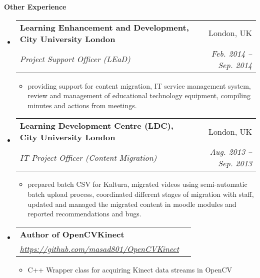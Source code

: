 \documentclass[letterpaper,11pt]{article}
\makeatletter
\newcommand{\resitem}[1]{\item #1 \vspace{-2pt}}
\newcommand{\resheading}[1]{{\large \colorbox{mygrey}{\begin{minipage}{\textwidth}{\textbf{#1 \vphantom{p\^{E}}}}\end{minipage}}}}
\newcommand{\ressubheading}[4]{
\begin{tabular*}{6.5in}{l@{\extracolsep{\fill}}r}
		\textbf{#1} & #2 \\
		\textit{#3} & \textit{#4} \\
\end{tabular*}\vspace{-6pt}}
\makeatother
\begin{document}
\resheading{Other Experience}
	\begin{itemize}
			\item 
			\ressubheading{Learning Enhancement and Development, City University London}{London, UK}{Project Support Officer (LEaD) }{Feb. 2014 -- Sep. 2014}
			{ \footnotesize
				\begin{itemize}
					\resitem{providing support for content migration, IT service management system, review and management of educational technology equipment, compiling minutes and actions from meetings.}				
				\end{itemize}
			}
			\item 
			\ressubheading{Learning Development Centre (LDC), City University London}{London, UK}{IT Project Officer (Content Migration)}{Aug. 2013 -- Sep. 2013}
			{ \footnotesize
				\begin{itemize}
					\resitem{prepared batch CSV for Kaltura, migrated videos using semi-automatic batch upload process, coordinated different stages of migration with staff, updated and managed the migrated content in moodle modules and reported recommendations and bugs.}				
				\end{itemize}
			}
%		
				\item 
			\ressubheading{Author of OpenCVKinect}{}{\href{https://github.com/masad801/OpenCVKinect}{https://github.com/masad801/OpenCVKinect}}{}
				{ \footnotesize
				\begin{itemize}
					\resitem{C++ Wrapper class for acquiring Kinect data streams in OpenCV}
				\end{itemize}
				}
			

\end{itemize}
\end{document}
